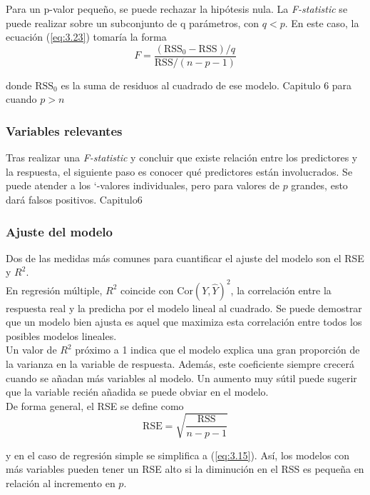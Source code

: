 Para un p-valor pequeño, se puede rechazar la hipótesis nula. La \textit{F-statistic} se puede realizar sobre un subconjunto de q parámetros, con $q < p$. En este caso, la ecuación (\ref{eq:3.23}) tomaría la forma 
\begin{equation}
F = \frac{(\text{RSS}_0 - \text{RSS})/q}{\text{RSS}/(n - p - 1)}
\end{equation}

\noindent donde $\text{RSS}_0$ es la suma de residuos al cuadrado de ese modelo. Capitulo 6 para cuando $p > n$

\subsubsection{Variables relevantes}

Tras realizar una \textit{F-statistic} y concluir que existe relación entre los predictores y la respuesta, el siguiente paso es conocer qué predictores están involucrados. Se puede atender a los `-valores individuales, pero para valores de $p$ grandes, esto dará falsos positivos. Capitulo6

\subsubsection{Ajuste del modelo}

Dos de las medidas más comunes para cuantificar el ajuste del modelo son el RSE y $R^2$. \\

En regresión múltiple, $R^2$ coincide con $\text{Cor}(Y, \hat{Y})^2$, la correlación entre la respuesta real y la predicha por el modelo lineal al cuadrado. Se puede demostrar que un modelo bien ajusta es aquel que maximiza esta correlación entre todos los posibles modelos lineales. \\

Un valor de $R^2$ próximo a 1 indica que el modelo explica una gran proporción de la varianza en la variable de respuesta. Además, este coeficiente siempre crecerá cuando se añadan más variables al modelo. Un aumento muy sútil puede sugerir que la variable recién añadida se puede obviar en el modelo. \\

\noindent De forma general, el RSE se define como 
\begin{equation}
\text{RSE} = \sqrt{\frac{\text{RSS}}{n - p - 1}}
\end{equation}

y en el caso de regresión simple se simplifica a (\ref{eq:3.15}). Así, los modelos con más variables pueden tener un RSE alto si la diminución en el RSS es pequeña en relación al incremento en $p$.

